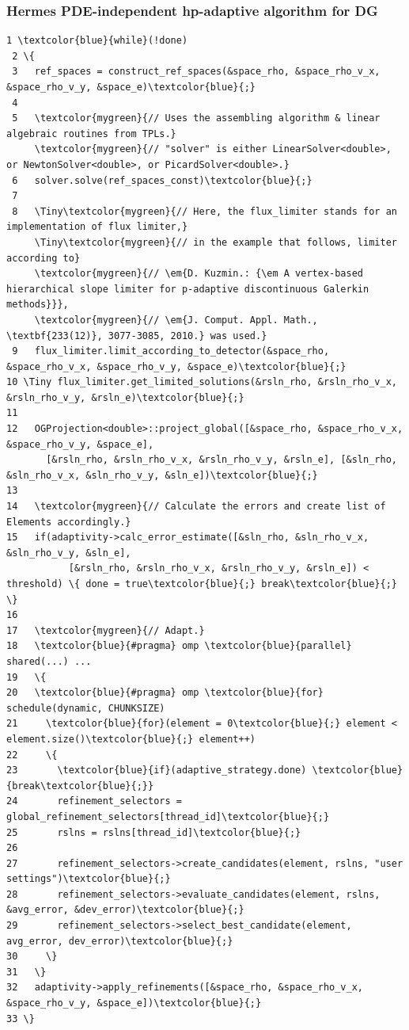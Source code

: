 \documentclass{beamer}
\begin{document}
\begin{frame}[fragile]
\frametitle{Hermes PDE-independent hp-adaptive algorithm for DG}
\begin{Verbatim}[commandchars=\\\{\}, fontsize=\Tinyc]
 1 \textcolor{blue}{while}(!done)
 2 \{
 3   ref_spaces = construct_ref_spaces(&space_rho, &space_rho_v_x, &space_rho_v_y, &space_e)\textcolor{blue}{;}
 4
 5   \textcolor{mygreen}{// Uses the assembling algorithm & linear algebraic routines from TPLs.}
     \textcolor{mygreen}{// "solver" is either LinearSolver<double>, or NewtonSolver<double>, or PicardSolver<double>.}
 6   solver.solve(ref_spaces_const)\textcolor{blue}{;}
 7   
 8   \Tiny\textcolor{mygreen}{// Here, the flux_limiter stands for an implementation of flux limiter,}
     \Tiny\textcolor{mygreen}{// in the example that follows, limiter according to}
     \textcolor{mygreen}{// \em{D. Kuzmin.: {\em A vertex-based hierarchical slope limiter for p-adaptive discontinuous Galerkin methods}}}, 
     \textcolor{mygreen}{// \em{J. Comput. Appl. Math., \textbf{233(12)}, 3077-3085, 2010.} was used.}
 9   flux_limiter.limit_according_to_detector(&space_rho, &space_rho_v_x, &space_rho_v_y, &space_e)\textcolor{blue}{;}
10 \Tiny flux_limiter.get_limited_solutions(&rsln_rho, &rsln_rho_v_x, &rsln_rho_v_y, &rsln_e)\textcolor{blue}{;}
11
12   OGProjection<double>::project_global([&space_rho, &space_rho_v_x, &space_rho_v_y, &space_e],
       [&rsln_rho, &rsln_rho_v_x, &rsln_rho_v_y, &rsln_e], [&sln_rho, &sln_rho_v_x, &sln_rho_v_y, &sln_e])\textcolor{blue}{;}
13
14   \textcolor{mygreen}{// Calculate the errors and create list of Elements accordingly.}
15   if(adaptivity->calc_error_estimate([&sln_rho, &sln_rho_v_x, &sln_rho_v_y, &sln_e],
           [&rsln_rho, &rsln_rho_v_x, &rsln_rho_v_y, &rsln_e]) < threshold) \{ done = true\textcolor{blue}{;} break\textcolor{blue}{;} \}
16 
17   \textcolor{mygreen}{// Adapt.}
18   \textcolor{blue}{#pragma} omp \textcolor{blue}{parallel} shared(...) ...
19   \{
20   \textcolor{blue}{#pragma} omp \textcolor{blue}{for} schedule(dynamic, CHUNKSIZE)
21     \textcolor{blue}{for}(element = 0\textcolor{blue}{;} element < element.size()\textcolor{blue}{;} element++)
22     \{
23       \textcolor{blue}{if}(adaptive_strategy.done) \textcolor{blue}{break\textcolor{blue}{;}}
24       refinement_selectors = global_refinement_selectors[thread_id]\textcolor{blue}{;}
25       rslns = rslns[thread_id]\textcolor{blue}{;}
26       
27       refinement_selectors->create_candidates(element, rslns, "user settings")\textcolor{blue}{;}
28       refinement_selectors->evaluate_candidates(element, rslns, &avg_error, &dev_error)\textcolor{blue}{;}
29       refinement_selectors->select_best_candidate(element, avg_error, dev_error)\textcolor{blue}{;}
30     \}
31   \}
32   adaptivity->apply_refinements([&space_rho, &space_rho_v_x, &space_rho_v_y, &space_e])\textcolor{blue}{;}
33 \}
\end{Verbatim}
\end{frame}
\end{document}
